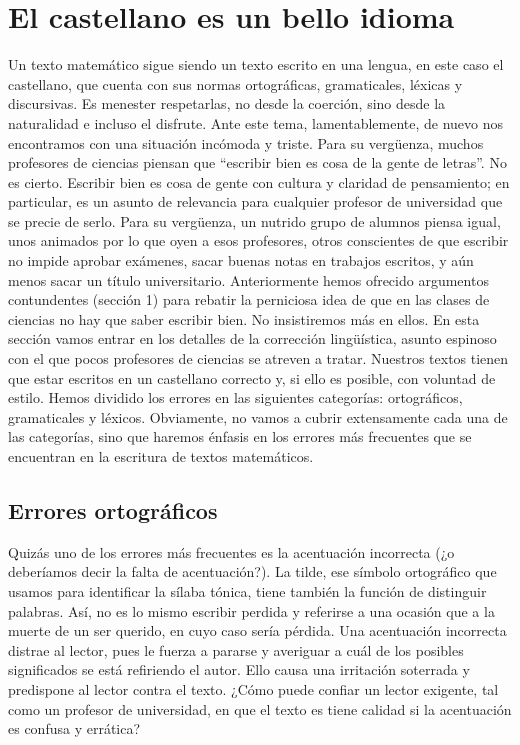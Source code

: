 \section{El castellano es un bello idioma}

Un texto matemático sigue siendo un texto escrito en una lengua, en este caso el castellano, que cuenta con sus normas ortográficas, gramaticales, léxicas y discursivas.
Es menester respetarlas, no desde la coerción, sino desde la naturalidad e incluso el disfrute.
Ante este tema, lamentablemente, de nuevo nos encontramos con una situación incómoda y triste.
Para su vergüenza, muchos profesores de ciencias piensan que ``escribir bien es cosa de la gente de letras''.
No es cierto.
Escribir bien es cosa de gente con cultura y claridad de pensamiento; en particular, es un asunto de relevancia para cualquier profesor de universidad que se precie de serlo.
Para su vergüenza, un nutrido grupo de alumnos piensa igual, unos animados por lo que oyen a esos profesores, otros conscientes de que escribir no impide aprobar exámenes, sacar buenas notas en trabajos escritos, y aún menos sacar un título universitario.
Anteriormente hemos ofrecido argumentos contundentes (sección 1) para rebatir la perniciosa idea de que en las clases de ciencias no hay que saber escribir bien.
No insistiremos más en ellos. En esta sección vamos entrar en los detalles de la corrección lingüística, asunto espinoso con el que pocos profesores de ciencias se atreven a tratar.
Nuestros textos tienen que estar escritos en un castellano correcto y, si ello es posible, con voluntad de estilo.
Hemos dividido los errores en las siguientes categorías: ortográficos, gramaticales y léxicos.
Obviamente, no vamos a cubrir extensamente cada una de las categorías, sino que haremos énfasis en los errores más frecuentes que se encuentran en la escritura de textos matemáticos.


\subsection{Errores ortográficos}

Quizás uno de los errores más frecuentes es la acentuación incorrecta (¿o deberíamos decir la falta de acentuación?).
La tilde, ese símbolo ortográfico que usamos para identificar la sílaba tónica, tiene también la función de distinguir palabras.
Así, no es lo mismo escribir perdida y referirse a una ocasión que a la muerte de un ser querido, en cuyo caso sería pérdida.
Una acentuación incorrecta distrae al lector, pues le fuerza a pararse y averiguar a cuál de los posibles significados se está refiriendo el autor.
Ello causa una irritación soterrada y predispone al lector contra el texto.
¿Cómo puede confiar un lector exigente, tal como un profesor de universidad, en que el texto es tiene calidad si la acentuación es confusa y errática?

